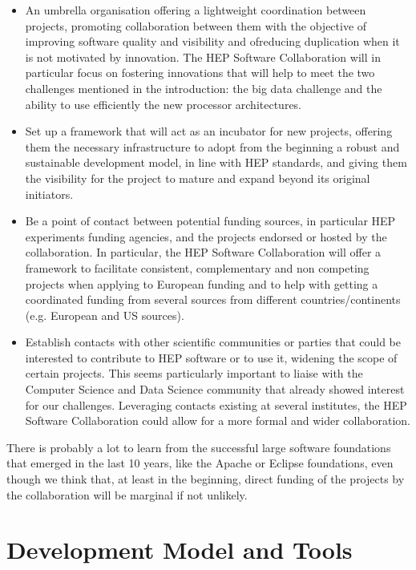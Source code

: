\documentclass[11pt]{article} %
\begin{document}
\begin{itemize}
\item
An umbrella organisation offering a lightweight coordination between projects, promoting collaboration between them
with the objective of improving software quality and visibility and ofreducing duplication when it is not motivated 
by innovation. The HEP Software Collaboration will in particular focus on fostering innovations that will help
to meet the two challenges mentioned in the introduction: the big data challenge and the ability to use efficiently
the new processor architectures.

\item
Set up a framework that will act as an incubator for new projects, offering them the necessary infrastructure
to adopt from the beginning a robust and sustainable development model, in line with HEP standards, and giving
them the visibility for the project to mature and expand beyond its original initiators.

\item
Be a point of contact between potential funding sources, in particular HEP experiments funding agencies, and the
projects endorsed or hosted by the collaboration. In particular, the HEP Software Collaboration will offer a
framework to facilitate consistent, complementary and non competing projects when applying to European funding
and to help with getting a coordinated funding from several sources from different countries/continents (e.g. European and US sources).

\item
Establish contacts with other scientific communities or parties that could be interested to contribute to HEP software
or to use it, widening the scope of certain projects. This seems particularly important to liaise with the Computer Science and Data Science
community that already showed interest for our challenges. Leveraging contacts existing at several institutes, the HEP
Software Collaboration could allow for a more formal and wider collaboration.

\end{itemize}

There is probably a lot to learn from the successful large software foundations that emerged in the last 10 years,
like the Apache or Eclipse foundations, even though we think that, at least in the beginning, direct funding of the
projects by the collaboration will be marginal if not unlikely.

\section{Development Model and Tools}
\end{document}
